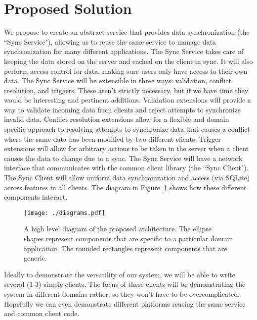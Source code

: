 \documentclass[12pt]{article}
\begin{document}
    \section{Proposed Solution}
    We propose to create an abstract service that provides data synchronization (the ``Sync Service"), allowing us to reuse the same service to manage data synchronization for many different applications.
    The Sync Service takes care of keeping the data stored on the server and cached on the client in sync. It will also perform access control for data, making sure users only have access to their own data.
    The Sync Service will be extensible in three ways: validation, conflict resolution, and triggers. These aren't strictly necessary, but if we have time they would be interesting and pertinent additions.
        Validation extensions will provide a way to validate incoming data from clients and reject attempts to synchronize invalid data.
        Conflict resolution extensions allow for a flexible and domain specific approach to resolving attempts to synchronize data that causes a conflict where the same data has been modified by two different clients.
        Trigger extensions will allow for arbitrary actions to be taken in the server when a client causes the data to change due to a sync.
    The Sync Service will have a network interface that communicates with the common client library (the ``Sync Client").
    The Sync Client will allow uniform data synchronization and access (via SQLite) across features in all clients.
    The diagram in Figure~\ref{fig:high-level} shows how these different components interact.

    \begin{figure}[h]
        \centering
        \texttt{[image: ./diagrams.pdf]}
        \caption{A high level diagram of the proposed architecture. The ellipse shapes represent components that are specific to a particular domain application. The rounded rectangles represent components that are generic. \label{fig:high-level}}
    \end{figure}

    Ideally to demonstrate the versatility of our system, we will be able to write several (1-3) simple clients. %
    The focus of these clients will be demonstrating the system in different domains rather, so they won't have to be overcomplicated.
    Hopefully we can even demonstrate different platforms reusing the same service and common client code.
\end{document}
